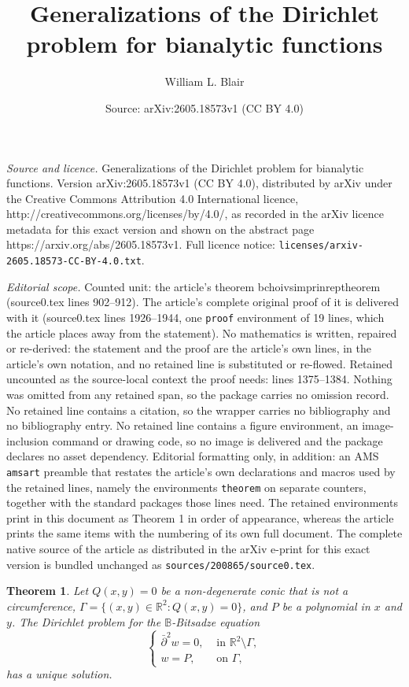 \documentclass[10pt,a4paper]{amsart}
\title{Generalizations of the Dirichlet problem for bianalytic functions}
\author{William L. Blair}
\date{Source: arXiv:2605.18573v1 (CC BY 4.0)}
\newtheorem{theorem}{Theorem}
\newcommand{\bc}{\mathbb{B}}
\newcommand{\dbar}{\bar\partial}
\begin{document}
\maketitle

\noindent\emph{Source and licence.} Generalizations of the Dirichlet problem for bianalytic functions. Version arXiv:2605.18573v1 (CC BY 4.0), distributed by arXiv under the Creative Commons Attribution 4.0 International licence, http://creativecommons.org/licenses/by/4.0/, as recorded in the arXiv licence metadata for this exact version and shown on the abstract page https://arxiv.org/abs/2605.18573v1. Full licence notice: \texttt{licenses/arxiv-2605.18573-CC-BY-4.0.txt}.\par\smallskip

\noindent\textit{Editorial scope.} Counted unit: the article's theorem bchoivsimprinreptheorem (source0.tex lines 902--912). The article's complete original proof of it is delivered with it (source0.tex lines 1926--1944, one \texttt{proof} environment of 19 lines, which the article places away from the statement). No mathematics is written, repaired or re-derived: the statement and the proof are the article's own lines, in the article's own notation, and no retained line is substituted or re-flowed.  Retained uncounted as the source-local context the proof needs: lines 1375--1384.  Nothing was omitted from any retained span, so the package carries no omission record.  No retained line contains a citation, so the wrapper carries no bibliography and no bibliography entry.  No retained line contains a figure environment, an image-inclusion command or drawing code, so no image is delivered and the package declares no asset dependency.  Editorial formatting only, in addition: an AMS \texttt{amsart} preamble that restates the article's own declarations and macros used by the retained lines, namely the environments \texttt{theorem} on separate counters, together with the standard packages those lines need.  The retained environments print in this document as Theorem 1 in order of appearance, whereas the article prints the same items with the numbering of its own full document.  The complete native source of the article as distributed in the arXiv e-print for this exact version is bundled unchanged as \texttt{sources/200865/source0.tex}.
            \begin{theorem}\label{thm: generalizationOfBianalyticWellPosed}
             Let $Q(x,y) = 0$ be a non-degenerate conic that is not a circumference, $\Gamma = \{(x,y) \in \mathbb{R}^2 : Q(x,y) = 0\}$, and $P$ be a polynomial in $x$ and $y$. The Dirichlet problem for the $\bc$-Bitsadze equation
                \begin{equation}\label{eq: bicomplexdirichletthm}
                    \begin{cases}
                        \dbar^2 w  = 0, & \text{ in } \mathbb{R}^2\setminus \Gamma,\\
                        w = P, & \text{ on } \Gamma,
                    \end{cases}
                \end{equation}
                has a unique solution.
                \end{theorem}
\end{document}
